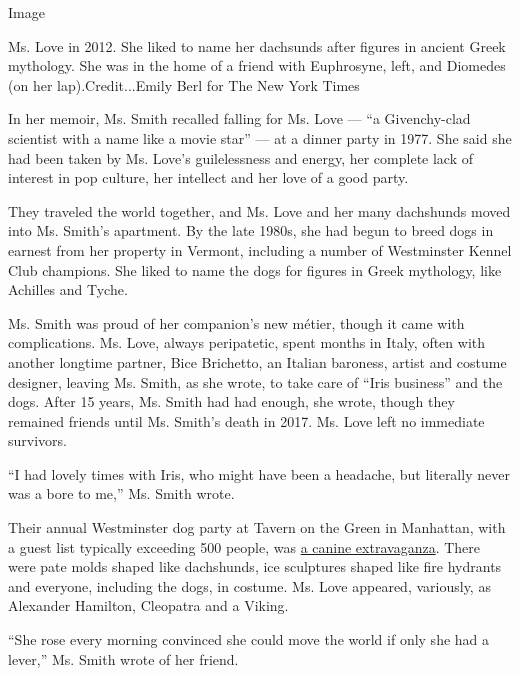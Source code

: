 Image

Ms. Love in 2012. She liked to name her dachsunds after figures in
ancient Greek mythology. She was in the home of a friend with
Euphrosyne, left, and Diomedes (on her lap).Credit...Emily Berl for The
New York Times

In her memoir, Ms. Smith recalled falling for Ms. Love --- ``a
Givenchy-clad scientist with a name like a movie star'' --- at a dinner
party in 1977. She said she had been taken by Ms. Love's guilelessness
and energy, her complete lack of interest in pop culture, her intellect
and her love of a good party.

They traveled the world together, and Ms. Love and her many dachshunds
moved into Ms. Smith's apartment. By the late 1980s, she had begun to
breed dogs in earnest from her property in Vermont, including a number
of Westminster Kennel Club champions. She liked to name the dogs for
figures in Greek mythology, like Achilles and Tyche.

Ms. Smith was proud of her companion's new métier, though it came with
complications. Ms. Love, always peripatetic, spent months in Italy,
often with another longtime partner, Bice Brichetto, an Italian
baroness, artist and costume designer, leaving Ms. Smith, as she wrote,
to take care of ``Iris business'' and the dogs. After 15 years, Ms.
Smith had had enough, she wrote, though they remained friends until Ms.
Smith's death in 2017. Ms. Love left no immediate survivors.

``I had lovely times with Iris, who might have been a headache, but
literally never was a bore to me,'' Ms. Smith wrote.

Their annual Westminster dog party at Tavern on the Green in Manhattan,
with a guest list typically exceeding 500 people, was
\href{https://www.nytimes.com/1996/02/18/style/in-westminster-show-season-dogs-are-party-animals.html}{a
canine extravaganza}. There were pate molds shaped like dachshunds, ice
sculptures shaped like fire hydrants and everyone, including the dogs,
in costume. Ms. Love appeared, variously, as Alexander Hamilton,
Cleopatra and a Viking.

``She rose every morning convinced she could move the world if only she
had a lever,'' Ms. Smith wrote of her friend.

\href{https://www.nytimes.com/interactive/2020/obituaries/people-died-coronavirus-obituaries.html?action=click\&pgtype=Article\&state=default\&region=BELOW_MAIN_CONTENT\&context=covid_obits_promo}{}

